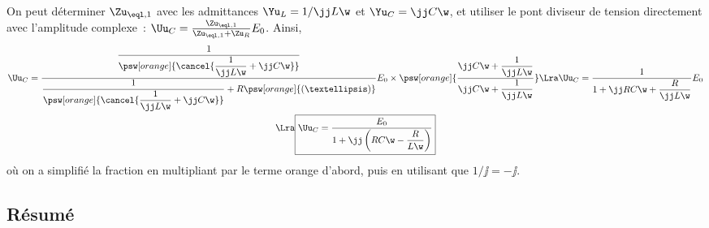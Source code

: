 \documentclass[../../main/main.tex]{subfiles}
\begin{document}
\begin{tcb}[valign=top]
{		On peut déterminer $\Zu_{\eql, 1}$ avec les admittances $\Yu_L = 1/\jj
			L \w$ et $\Yu_C = \jj C\w$, et utiliser le pont diviseur de tension
		directement avec l'amplitude complexe~: $\Uu_C =
			\frac{\Zu_{\eql,1}}{\Zu_{\eql,1}+\Zu_R}E_0$. Ainsi,
		\begin{gather*}
			\Uu_C = \frac{\dfrac{1}{%
					\psw[orange]{\cancel{\dfrac{1}{\jj L\w} + \jj C\w}}}}
			{\dfrac{1}{\psw[orange]{\cancel{\dfrac{1}{\jj L\w} + \jj C\w}}}
				+ R\psw[orange]{(…)}}E_0
			\times \psw[orange]{
				\frac{\jj C\w + \dfrac{1}{\jj L\w}}{\jj C\w + \dfrac{1}{\jj L\w}}}
			\Lra
			\Uu_C = \frac{1}{1 + \jj RC\w + \dfrac{R}{\jj L\w}}E_0\\
			\Lra
			\boxed{
				\Uu_C = \frac{E_0}{1 + \jj \left( RC\w - \dfrac{R}{L\w} \right)}
			}%
		\end{gather*}
		où on a simplifié la fraction en multipliant par le terme orange d'abord,
		puis en utilisant que $1/\jj = -\jj$.
	}%
\end{tcb}

\subsection{Résumé}
\end{document}
